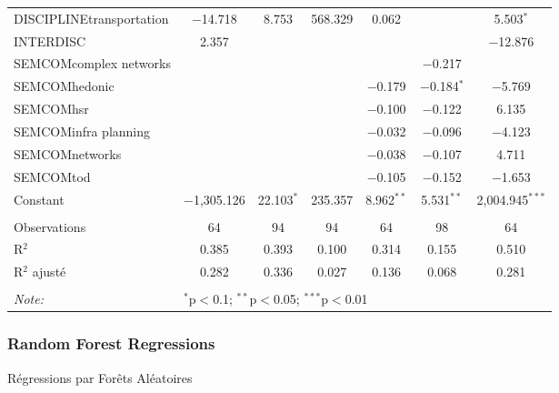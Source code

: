\begin{table}[!htbp]
\begin{tabular}{lcccccc}
  DISCIPLINEtransportation & $-$14.718 & 8.753 & 568.329 & 0.062 &  & 5.503$^{*}$ \\ 
  INTERDISC & 2.357 &  &  &  &  & $-$12.876 \\ 
  SEMCOMcomplex networks &  &  &  &  & $-$0.217 &  \\ 
  SEMCOMhedonic &  &  &  & $-$0.179 & $-$0.184$^{*}$ & $-$5.769 \\ 
  SEMCOMhsr &  &  &  & $-$0.100 & $-$0.122 & 6.135 \\ 
  SEMCOMinfra planning &  &  &  & $-$0.032 & $-$0.096 & $-$4.123 \\ 
  SEMCOMnetworks &  &  &  & $-$0.038 & $-$0.107 & 4.711 \\ 
  SEMCOMtod &  &  &  & $-$0.105 & $-$0.152 & $-$1.653 \\ 
  Constant & $-$1,305.126 & 22.103$^{*}$ & 235.357 & 8.962$^{**}$ & 5.531$^{**}$ & 2,004.945$^{***}$ \\ 
 \hline \\[-1.8ex] 
Observations & 64 & 94 & 94 & 64 & 98 & 64 \\ 
R$^{2}$ & 0.385 & 0.393 & 0.100 & 0.314 & 0.155 & 0.510 \\ 
R$^{2}$ ajusté & 0.282 & 0.336 & 0.027 & 0.136 & 0.068 & 0.281 \\ 
\hline 
\hline \\[-1.8ex] 
\textit{Note:}  & \multicolumn{6}{l}{$^{*}$p$<$0.1; $^{**}$p$<$0.05; $^{***}$p$<$0.01} \\ 
\end{tabular}
\end{table} 




\subsubsection{Random Forest Regressions}{Régressions par Forêts Aléatoires}


